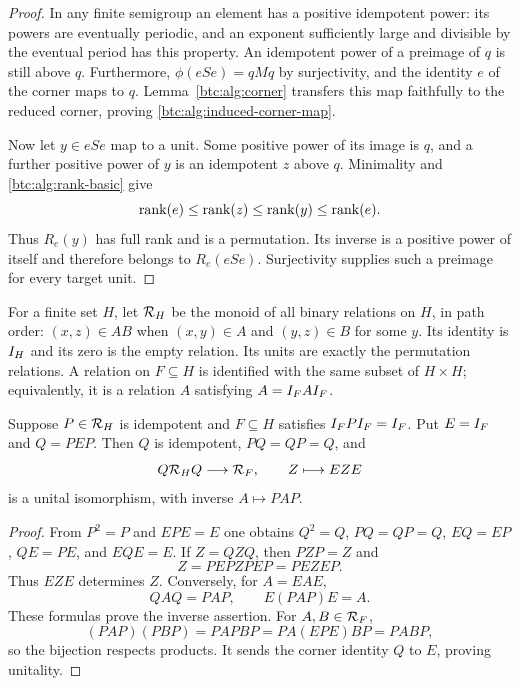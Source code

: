 \begin{proof}
In any finite semigroup an element has a positive idempotent power:
its powers are eventually periodic, and an exponent sufficiently
large and divisible by the eventual period has this property.
An idempotent power of a preimage of $q$ is still above $q$.
Furthermore, $\phi(eSe)=qMq$ by surjectivity, and the identity
$e$ of the corner maps to $q$. Lemma~\ref{btc:alg:corner} transfers this
map faithfully to the reduced corner, proving
\eqref{btc:alg:induced-corner-map}.

Now let $y\in eSe$ map to a unit. Some positive power of its image
is $q$, and a further positive power of $y$ is an idempotent $z$
above $q$. Minimality and \eqref{btc:alg:rank-basic} give
\[
 \operatorname{rank}(e)\le\operatorname{rank}(z)\le\operatorname{rank}(y)\le\operatorname{rank}(e).
\]
Thus $R_e(y)$ has full rank and is a permutation. Its inverse is
a positive power of itself and therefore belongs to $R_e(eSe)$.
Surjectivity supplies such a preimage for every target unit.
\end{proof}

For a finite set $H$, let $\mathcal{R}_{H}$ be the monoid of all binary
relations on $H$, in path order:
$(x,z)\in AB$ when $(x,y)\in A$ and $(y,z)\in B$ for some $y$.
Its identity is $I_H$ and its zero is the empty relation. Its
units are exactly the permutation relations. A relation on
$F\subseteq H$ is identified with the same subset of $H\times H$;
equivalently, it is a relation $A$ satisfying $A=I_FAI_F$.

\begin{lemma}\label{btc:alg:relation-corner}
Suppose $P\in\mathcal{R}_{H}$ is idempotent and $F\subseteq H$ satisfies
$I_FPI_F=I_F$. Put $E=I_F$ and $Q=PEP$. Then $Q$ is
idempotent, $PQ=QP=Q$, and
\begin{equation}\label{btc:alg:relation-corner-iso}
 Q\mathcal{R}_{H}Q\longrightarrow\mathcal{R}_{F},\qquad Z\longmapsto EZE
\end{equation}
is a unital isomorphism, with inverse $A\mapsto PAP$.
\end{lemma}

\begin{proof}
From $P^2=P$ and $EPE=E$ one obtains
$Q^2=Q$, $PQ=QP=Q$, $EQ=EP$, $QE=PE$, and $EQE=E$.
If $Z=QZQ$, then $PZP=Z$ and
\[
 Z=PEPZPEP=PEZEP.
\]
Thus $EZE$ determines $Z$. Conversely, for $A=EAE$,
\[
 QAQ=PAP,\qquad E(PAP)E=A.
\]
These formulas prove the inverse assertion. For $A,B\in\mathcal{R}_{F}$,
\[
 (PAP)(PBP)=PAPBP=PA(EPE)BP=PABP,
\]
so the bijection respects products. It sends the corner identity
$Q$ to $E$, proving unitality.
\end{proof}

